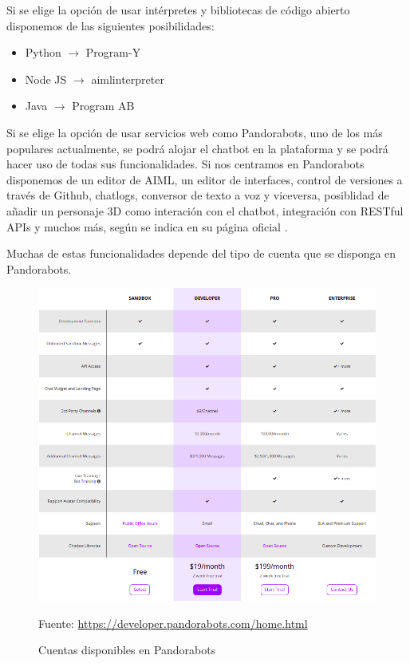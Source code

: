 Si se elige la opción de usar intérpretes y bibliotecas de código abierto disponemos de las siguientes posibilidades:

\begin{itemize}
    \item Python $\rightarrow$ Program-Y
    \item Node JS $\rightarrow$ aimlinterpreter
    \item Java $\rightarrow$ Program AB
\end{itemize}

Si se elige la opción de usar servicios web como Pandorabots, uno de los más populares actualmente, se podrá alojar el chatbot en la plataforma y se podrá hacer uso de todas sus funcionalidades. Si nos centramos en Pandorabots disponemos de un editor de AIML, un editor de interfaces, control de versiones a través de Github, chatlogs, conversor de texto a voz y viceversa, posiblidad de añadir un personaje 3D como interación con el chatbot, integración con RESTful APIs y muchos más, según se indica en su página oficial \cite{RefWorks:RefID:14-pandorabots:}.

Muchas de estas funcionalidades depende del tipo de cuenta que se disponga en Pandorabots.

\newpage

\begin{figure}[h]
    \centering
    \includegraphics[width=1.0\textwidth]{imagenes/02_EstadoDelArte/cuentas_pandorabots.png}
    \begin{center}
        Fuente: \url{https://developer.pandorabots.com/home.html}
    \end{center}
    \caption{Cuentas disponibles en Pandorabots}
    \label{fig:cuenta_pandorabots}
\end{figure}

